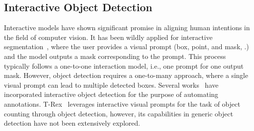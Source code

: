 \subsection{Interactive Object Detection} 
Interactive models have shown significant promise in aligning human intentions in the field of computer vision. It has been wildly applied for interactive segmentation~\cite{kirillov2023segment, li2023semantic, zou2023segment}, where the user provides a visual prompt (box, point, and mask, \etc.) and the model outputs a mask corresponding to the prompt. This process typically follows a one-to-one interaction model, i.e., one prompt for one output mask. However, object detection requires a one-to-many approach, where a single visual prompt can lead to multiple detected boxes. Several works~\cite{yao2012interactive,lee2022interactive} have incorporated interactive object detection for the purpose of automating annotations. T-Rex~\cite{jiang2023t} leverages interactive visual prompts for the task of object counting through object detection, however, its capabilities in generic object detection have not been extensively explored.


